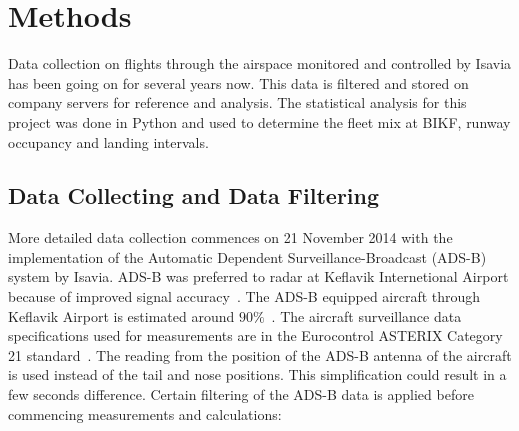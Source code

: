\chapter{Methods\label{cha:methods}}
Data collection on flights through the airspace monitored and controlled by Isavia has been going on for several years now. This data is filtered and stored on company servers for reference and analysis. The statistical analysis for this project was done in Python and used to determine the fleet mix at BIKF, runway occupancy and landing intervals.

\section{Data Collecting and Data Filtering}
More detailed data collection commences on 21 November 2014 with the implementation of the Automatic Dependent Surveillance-Broadcast (ADS-B) system by Isavia. ADS-B was preferred to radar at Keflavik Internetional Airport because of improved signal accuracy~\cite{isavia_wiki}. The ADS-B equipped aircraft through Keflavik Airport is estimated around $90\%$~\cite{isavia-rounardeild_rannsoknir_2018}. The aircraft surveillance data specifications used for measurements are in the Eurocontrol ASTERIX Category 21 standard~\cite{ASTERIX_ADS-B_specs}.
The reading from the position of the ADS-B antenna of the aircraft is used instead of the tail and nose positions. This simplification could result in a few seconds difference. Certain filtering of the ADS-B data is applied before commencing measurements and calculations: 
